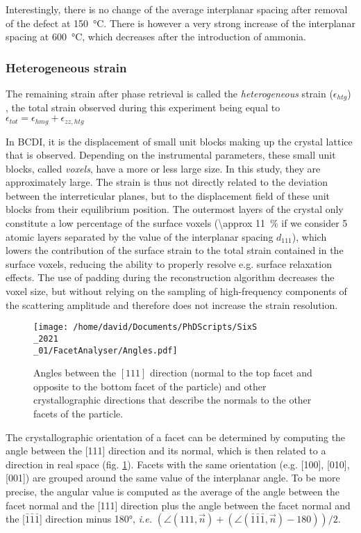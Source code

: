 Interestingly, there is no change of the average interplanar spacing after removal of the defect at \qty{150}{\degreeCelsius}.
There is however a very strong increase of the interplanar spacing at \qty{600}{\degreeCelsius}, which decreases after the introduction of ammonia.

\subsubsection{Heterogeneous strain}

The remaining strain after phase retrieval is called the \textit{heterogeneous} strain ($\epsilon_{htg}$) \parencite{GREDIAC1996, FAVIER2007, Atlan2023}, the total strain observed during this experiment being equal to $\epsilon_{tot} = \epsilon_{hmg} + \epsilon_{zz, htg}$

In BCDI, it is the displacement of small unit blocks making up the crystal lattice that is observed.
Depending on the instrumental parameters, these small unit blocks, called \textit{voxels}, have a more or less large size.
In this study, they are approximately  large.
The strain is thus not directly related to the deviation between the interreticular planes, but to the displacement field of these unit blocks from their equilibrium position.
The outermost layers of the crystal only constitute a low percentage of the surface voxels (\qty{\approx 11}{\percent} if we consider 5 atomic layers separated by the value of the interplanar spacing $d_{111}$), which lowers the contribution of the surface strain to the total strain contained in the surface voxels, reducing the ability to properly resolve e.g. surface relaxation effects.
The use of padding during the reconstruction algorithm decreases the voxel size, but without relying on the sampling of high-frequency components of the scattering amplitude and therefore does not increase the strain resolution.

\begin{figure}[!htb]
    \centering
    \texttt{[image: /home/david/Documents/PhDScripts/SixS\\\_2021\\\_01/FacetAnalyser/Angles.pdf]}
    \caption{
        Angles between the $[111]$ direction (normal to the top facet and opposite to the bottom facet of the particle) and other crystallographic directions that describe the normals to the other facets of the particle.
    }
    \label{fig:Angles}
\end{figure}

The crystallographic orientation of a facet can be determined by computing the angle between the [111] direction and its normal, which is then related to a direction in real space (fig. \ref{fig:Angles}).
Facets with the same orientation (e.g. [100], [010], [001]) are grouped around the same value of the interplanar angle.
To be more precise, the angular value is computed as the average of the angle between the facet normal and the [111] direction plus the angle between the facet normal and the [$\bar{1}\bar{1}\bar{1}$] direction minus \ang{180}, \textit{i.e.} $(\angle (111, \vec{n}) + (\angle (\bar{1}\bar{1}\bar{1}, \vec{n}) -180))/2$.

